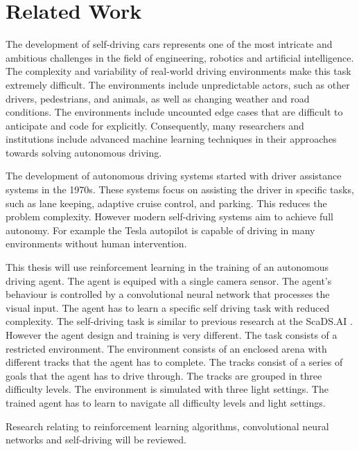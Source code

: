 \chapter{Related Work}
\label{cha:Related Work}


The development of self-driving cars represents one of the most intricate and ambitious challenges in the field of engineering, robotics and artificial intelligence. The complexity and variability of real-world driving environments make this task extremely difficult. The environments include unpredictable actors, such as other drivers, pedestrians, and animals, as well as changing weather and road conditions. The environments include uncounted edge cases that are difficult to anticipate and code for explicitly. Consequently, many researchers and institutions include advanced machine learning techniques in their approaches towards solving autonomous driving.

The development of autonomous driving systems started with driver assistance systems in the 1970s. These systems focus on assisting the driver in specific tasks, such as lane keeping, adaptive cruise control, and parking. This reduces the problem complexity. However modern self-driving systems aim to achieve full autonomy. For example the Tesla autopilot is capable of driving in many environments without human intervention.

This thesis will use reinforcement learning in the training of an autonomous driving agent. The agent is equiped with a single camera sensor. The agent's behaviour is controlled by a convolutional neural network that processes the visual input. The agent has to learn a specific self driving task with reduced complexity. The self-driving task is similar to previous research at the ScaDS.AI \textcite{maximilian}. However the agent design and training is very different.
The task consists of a restricted environment. The environment consists of an enclosed arena with different tracks that the agent has to complete. The tracks consist of a series of goals that the agent has to drive through. The tracks are grouped in three difficulty levels.
The environment is simulated with three light settings. The trained agent has to learn to navigate all difficulty levels and light settings.

Research relating to reinforcement learning algorithms, convolutional neural networks and self-driving will be reviewed.



